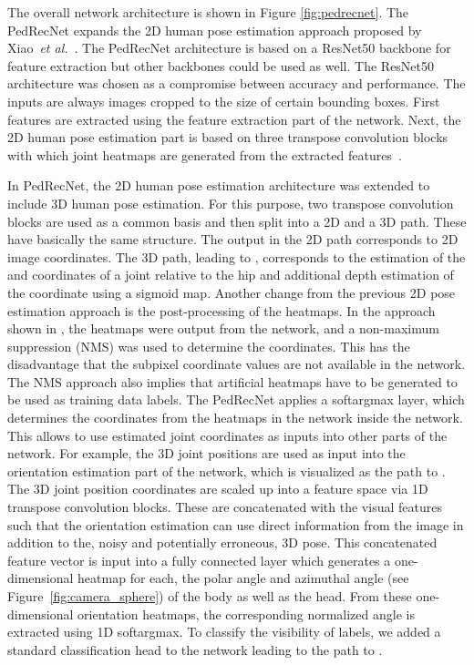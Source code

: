 \documentclass[a4paper, 10pt, conference]{ieeeconf}
\begin{document}
The overall network architecture is shown in Figure \ref{fig:pedrecnet}. The PedRecNet expands the 2D human pose estimation approach proposed by Xiao~\textit{et al.}~\cite{xiaoSimpleBaselinesHuman2018}. The PedRecNet architecture is based on a ResNet50 backbone for feature extraction but other backbones could be used as well. The ResNet50 architecture was chosen as a compromise between accuracy and performance. The inputs  are always images cropped to the size of certain bounding boxes. First features  are extracted using the feature extraction part of the network. Next, the 2D human pose estimation part is based on three transpose convolution blocks with which joint heatmaps are generated from the extracted features~\cite{xiaoSimpleBaselinesHuman2018}. 

In PedRecNet, the 2D human pose estimation architecture was extended to include 3D human pose estimation. For this purpose, two transpose convolution blocks are used as a common basis and then split into a 2D and a 3D path. These have basically the same structure. The output in the 2D path corresponds to 2D image coordinates. The 3D path, leading to , corresponds to the estimation of the  and  coordinates of a joint relative to the hip and additional depth estimation of the  coordinate using a sigmoid map. Another change from the previous 2D pose estimation approach is the post-processing of the heatmaps. In the approach shown in \cite{ludlSimpleEfficientRealtime2019}, the heatmaps were output from the network, and a non-maximum suppression (NMS) was used to determine the coordinates. This has the disadvantage that the subpixel coordinate values are not available in the network. The NMS approach also implies that artificial heatmaps have to be generated to be used as training data labels. The PedRecNet applies a softargmax layer, which determines the coordinates from the heatmaps in the network inside the network. This allows to use estimated joint coordinates as inputs into other parts of the network. For example, the 3D joint positions are used as input into the orientation estimation part of the network, which is visualized as the path to . The 3D joint position coordinates are scaled up into a feature space via 1D transpose convolution blocks. These are concatenated with the visual features  such that the orientation estimation can use direct information from the image in addition to the, noisy and potentially erroneous, 3D pose. This concatenated feature vector is input into a fully connected layer which generates a one-dimensional heatmap for each, the polar angle  and azimuthal angle  (see Figure~\ref{fig:camera_sphere}) of the body as well as the head. From these one-dimensional orientation heatmaps, the corresponding normalized angle is extracted using 1D softargmax. To classify the visibility of labels, we added a standard classification head to the network leading to the path to .
\end{document}
